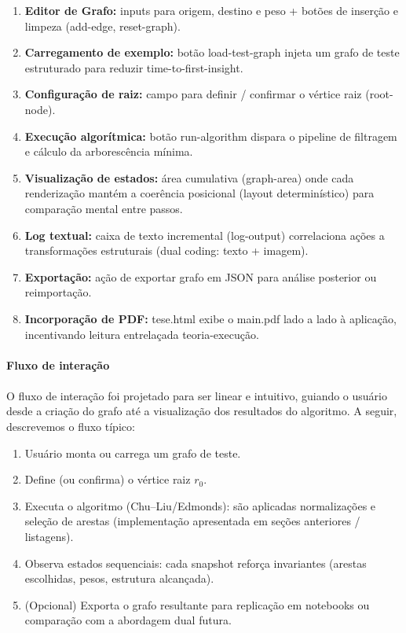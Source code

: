 \documentclass[12pt,a4paper]{article}
\def\texttt#1{#1}%
\def\emph#1{#1}%
\begin{document}
\begin{enumerate}\setlength{\itemsep}{2pt}
    \item \textbf{Editor de Grafo:} inputs para origem, destino e peso + botões de inserção e limpeza (\texttt{add-edge}, \texttt{reset-graph}).
    \item \textbf{Carregamento de exemplo:} botão \texttt{load-test-graph} injeta um grafo de teste estruturado para reduzir \emph{time-to-first-insight}.
    \item \textbf{Configuração de raiz:} campo para definir / confirmar o vértice raiz (\texttt{root-node}).
    \item \textbf{Execução algorítmica:} botão \texttt{run-algorithm} dispara o pipeline de filtragem e cálculo da arborescência mínima.
    \item \textbf{Visualização de estados:} área cumulativa (\texttt{graph-area}) onde cada renderização mantém a coerência posicional (layout determinístico) para comparação mental entre passos.
    \item \textbf{Log textual:} caixa de texto incremental (\texttt{log-output}) correlaciona ações a transformações estruturais (dual coding: texto + imagem).
    \item \textbf{Exportação:} ação de exportar grafo em JSON para análise posterior ou reimportação.
    \item \textbf{Incorporação de PDF:} \texttt{tese.html} exibe o \texttt{main.pdf} lado a lado à aplicação, incentivando leitura entrelaçada teoria-execução.
\end{enumerate}

\paragraph{Fluxo de interação}
\paragraph{}
O fluxo de interação foi projetado para ser linear e intuitivo, guiando o usuário desde a criação do grafo até a visualização dos resultados do algoritmo. A seguir, descrevemos o fluxo típico:

\begin{enumerate}\setlength{\itemsep}{2pt}
    \item Usuário monta ou carrega um grafo de teste.
    \item Define (ou confirma) o vértice raiz \(r_0\).
    \item Executa o algoritmo (Chu--Liu/Edmonds): são aplicadas normalizações e seleção de arestas (implementação apresentada em seções anteriores / listagens).
    \item Observa estados sequenciais: cada snapshot reforça invariantes (arestas escolhidas, pesos, estrutura alcançada).
    \item (Opcional) Exporta o grafo resultante para replicação em notebooks ou comparação com a abordagem dual futura.
\end{enumerate}
\end{document}
